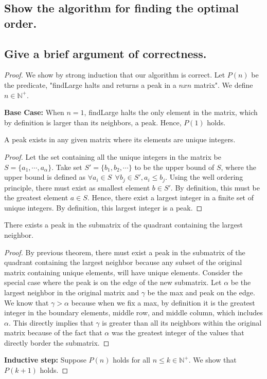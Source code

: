 \documentclass[11pt]{scrartcl}
\begin{document}
\subsection{
	Show the algorithm for finding the optimal order.
}

\subsection{
	Give a brief argument of correctness.
}
\begin{proof}
	We show by strong induction that our algorithm is correct. Let $P(n)$ be the predicate,
	"findLarge halts and returns a peak in a $nxn$ matrix".
	We define $n \in \mathbb{N^{+}}$.
	\par \textbf{Base Case:} When $n = 1$, findLarge halts the only element in the matrix, which by definition
	is larger than its neighbors, a peak. Hence, $P(1)$ holds.
	\begin{theorem*}
		A peak exists in any given matrix where its elements are unique integers.
		\begin{proof}
			Let the set
			containing all the unique integers in the matrix be $S = \{a_1, \cdots, a_\alpha\}$.
			Take set $S' = \{b_1, b_2, \cdots\}$ to be the upper bound of $S$,
			where the upper bound is defined as $ \forall a_i \in S \ \ \forall b_j \in S', a_i \leq b_j$.
			Using the well ordering principle, there must exist as smallest element $b \in S'$.
			By definition, this must be the greatest element $a \in S$.
			Hence, there exist a largest integer in a finite set of unique integers.
			By definition, this largest integer is a peak.
		\end{proof}
	\end{theorem*}
	\begin{corollary*}
		There exists a peak in the submatrix of the quadrant containing the largest neighbor.
		\begin{proof}
			By previous theorem, there must exist a peak in the submatrix of the quadrant containing the largest neighbor
			because any subset of the original matrix containing unique elements, will have unique elements. Consider the
			special case where the peak is on the edge of the new submatrix. Let $\alpha$ be the largest neighbor in the original
			matrix and $\gamma$ be the max and peak on the edge. We know that $\gamma > \alpha$ because when we fix a max,
			by definition it is the
			greatest integer in the boundary elements, middle row, and middle column, which includes
			$\alpha$. This directly implies that $\gamma$
			is greater than all its neighbors within the original matrix because of the fact that $\alpha$ was the
			greatest integer of the values that directly border the submatrix.
		\end{proof}
	\end{corollary*}
	\par \textbf{Inductive step:} Suppose $P(n)$ holds for all $n \leq k \in \mathbb{N}^{+}$. We show that $P(k+1)$ holds.


\end{proof}
\end{document}
